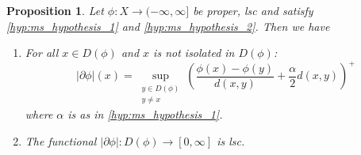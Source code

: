 \documentclass[a4paper,11pt, leqno]{scrreprt} %
\theoremstyle{change}
\newcounter{acounter}[chapter]
\newtheorem{proposition}[acounter]{Proposition}
\theoremstyle{nonumberplain}
\begin{document}
\begin{proposition}
  Let $\phi : X \to (-\infty, \infty]$ be proper, lsc and satisfy
  \ref{hyp:ms_hypothesis_1} and \ref{hyp:ms_hypothesis_2}. Then we
  have
  \begin{enumerate}
  \item\label{item:ms_prop_2_1} For all $x \in D(\phi)$ and $x$ is not isolated in $D(\phi)$:
    \begin{equation}
      \label{eq:ms_prop_2_1}
      |\partial \phi|(x) = \sup_{\substack{y \in D(\phi)\\ y \neq x}}
        \left ( \frac{\phi(x) - \phi(y)}{d(x, y)} + \frac\alpha2 d(x,
          y) \right )^+
    \end{equation}
    where $\alpha$ is as in \ref{hyp:ms_hypothesis_1}.
   \item\label{item:ms_prop_2_1} The functional $|\partial \phi|: D(\phi) \to [0, \infty]$ is lsc.
  \end{enumerate}
\end{proposition}
\end{document}
